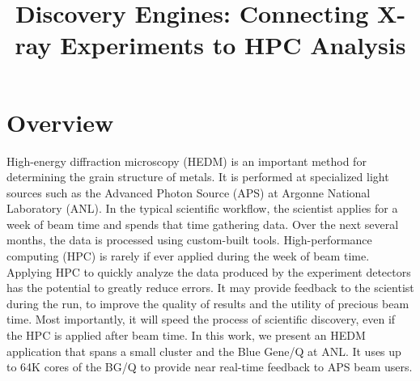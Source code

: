 \documentclass[conference,10pt]{IEEEtran}
\begin{document}
\setlength{\pdfpageheight}{\paperheight}
\setlength{\pdfpagewidth}{\paperwidth}

\newcommand{\topic}[1] { { \noindent $\bullet$ \textbf{ #1:}}}


\title{Discovery Engines: Connecting X-ray Experiments to HPC Analysis}

\author{
}

\maketitle

\section{Overview}

High-energy diffraction microscopy (HEDM) is an important method for
determining the grain structure of metals.  It is performed at
specialized light sources such as the Advanced Photon Source (APS) at
Argonne National Laboratory (ANL).  In the typical scientific
workflow, the scientist applies for a week of beam time and spends
that time gathering data.  Over the next several months, the data is
processed using custom-built tools.  High-performance computing (HPC)
is rarely if ever applied during the week of beam time.  Applying HPC
to quickly analyze the data produced by the experiment detectors has
the potential to greatly reduce errors.  It may provide feedback to
the scientist during the run, to improve the quality of results and
the utility of precious beam time.  Most importantly, it will speed
the process of scientific discovery, even if the HPC is applied after
beam time. In this work, we present an HEDM application that spans a
small cluster and the Blue Gene/Q at ANL.  It uses up to 64K cores of
the BG/Q to provide near real-time feedback to APS beam users.
\end{document}
